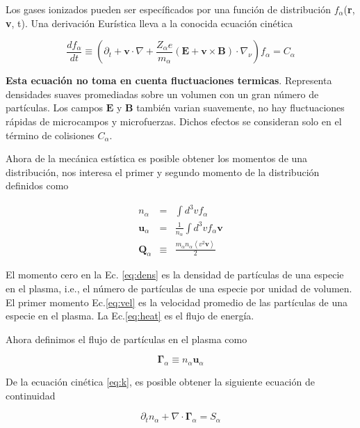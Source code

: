\documentclass[11pt]{article}
\theoremstyle{definition}
\begin{document}
  Los gases ionizados pueden ser espec\'ificados por una funci\'on de distribuci\'on $f_\alpha$(\textbf{r}, \textbf{v}, t). Una derivaci\'on Eur\'istica lleva a la conocida ecuaci\'on cin\'etica\cite{freidberg2014} 

  \begin{equation}\label{eq:k}
    \frac{df_\alpha}{dt} \equiv \left(\partial_t + \textbf{v}\cdot\nabla + \frac{Z_\alpha e}{m_\alpha}(\textbf{E} + \textbf{v}\times\textbf{B})\cdot \nabla_\nu \right)f_\alpha = C_\alpha
  \end{equation}

  \textbf{Esta ecuaci\'on no toma en cuenta fluctuaciones termicas}. Representa densidades suaves promediadas sobre un volumen con un gran n\'umero de part\'iculas. Los campos $\textbf{E}$ y $\textbf{B}$ tambi\'en varian suavemente, no hay fluctuaciones r\'apidas de microcampos y microfuerzas. Dichos efectos se consideran solo en el t\'ermino de colisiones $C_\alpha$.

  Ahora de la mec\'anica est\'istica es posible obtener los momentos de una distribuci\'on, nos interesa el primer y segundo momento\cite{helander2005} de la distribuci\'on definidos como 

  \begin{eqnarray}
    n_\alpha &=& \int d^3v f_\alpha \label{eq:dens}\\
    \textbf{u}_{\alpha} &=& \frac{1}{n_\alpha}\int d^3v f_\alpha\textbf{v} \label{eq:vel} \\
    \textbf{Q}_\alpha &\equiv& \frac{m_\alpha n_\alpha \left<v^2\textbf{v}\right>}{2}
  \end{eqnarray}

El momento cero en la Ec. \eqref{eq:dens} es la densidad de part\'iculas de una especie en el plasma, i.e., el n\'umero de part\'iculas de una especie por unidad de volumen. El primer momento Ec.\eqref{eq:vel} es la velocidad promedio de las part\'iculas de una especie en el plasma. La Ec.\eqref{eq:heat} es el flujo de energ\'ia. 

  Ahora definimos el flujo de part\'iculas en el plasma como 
  
  \begin{equation}
    \pmb{\Gamma}_\alpha \equiv n_\alpha\textbf{u}_\alpha
  \end{equation}

  De la ecuaci\'on cin\'etica \eqref{eq:k}, es posible obtener la siguiente ecuaci\'on de continuidad

  \begin{equation}\label{eq:cont}
    \partial_t n_\alpha + \nabla\cdot\pmb{\Gamma}_\alpha = S_\alpha
  \end{equation}
\end{document}
